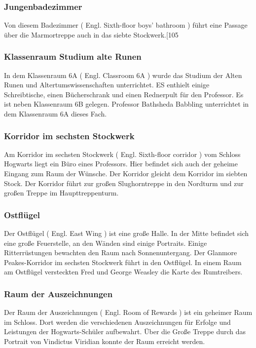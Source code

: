 \documentclass[a4paper, 10pt]{article}
\begin{document}
\subsubsection*{\large Jungenbadezimmer}
Von diesem Badezimmer (  Engl.  Sixth-floor boys' bathroom ) führt eine Passage über die Marmortreppe auch in das siebte Stockwerk.[105
\subsubsection*{\large Klassenraum Studium alte Runen}
In dem Klassenraum 6A (  Engl.  Classroom 6A ) wurde das Studium der Alten Runen und Altertumswissenschaften unterrichtet. ES enthielt einige Schreibtische, einen Bücherschrank und einen Rednerpult für den Professor. Es ist neben Klassenraum 6B gelegen. Professor Bathsheda Babbling unterrichtet in dem Klassenraum 6A dieses Fach.
\subsubsection*{\large Korridor im sechsten Stockwerk}
Am Korridor im sechsten Stockwerk (  Engl.  Sixth-floor corridor ) vom Schloss Hogwarts liegt ein Büro eines Professors. Hier befindet sich auch der geheime Eingang zum Raum der Wünsche. Der Korridor gleicht dem Korridor im siebten Stock.
\vspace{10pt}
\newline
Der Korridor führt zur großen Slughorntreppe in den Nordturm und zur großen Treppe im Haupttreppenturm.
\subsubsection*{\large Ostflügel}
Der Ostflügel (  Engl.  East Wing ) ist eine große Halle. In der Mitte befindet sich eine große Feuerstelle, an den Wänden sind einige Portraits. Einige Ritterrüstungen bewachten den Raum nach Sonnenuntergang. Der Glanmore Peakes-Korridor im sechsten Stockwerk führt in den Ostflügel. In einem Raum am Ostflügel versteckten Fred und George Weasley die Karte des Rumtreibers.
\subsubsection*{\large Raum der Auszeichnungen}
Der Raum der Auszeichnungen (  Engl.  Room of Rewards ) ist ein geheimer Raum im Schloss. Dort werden die verschiedenen Auszeichnungen für Erfolge und Leistungen der Hogwarts-Schüler aufbewahrt. Über die Große Treppe durch das Portrait von Vindictus Viridian konnte der Raum erreicht werden.
\end{document}
